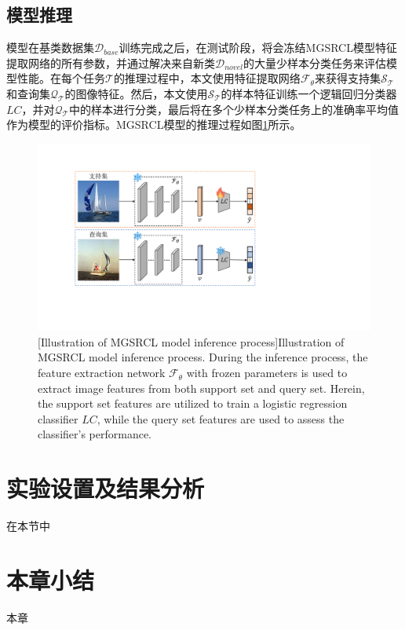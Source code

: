 \subsection[\hspace{-2pt}模型推理]{{\heiti{} \hspace{-8pt}模型推理}}\label{section3: 模型推理}
模型在基类数据集$\mathcal{D}_{base}$训练完成之后，在测试阶段，将会冻结MGSRCL模型特征提取网络的所有参数，并通过解决来自新类$\mathcal{D}_{novel}$的大量少样本分类任务来评估模型性能。在每个任务$\mathcal{T}$的推理过程中，本文使用特征提取网络$\mathcal{F}_{\theta}$来获得支持集$\mathcal{S}_\mathcal{T}$和查询集$\mathcal{Q}_\mathcal{T}$的图像特征。然后，本文使用$\mathcal{S}_\mathcal{T}$的样本特征训练一个逻辑回归分类器$LC$，并对$\mathcal{Q}_\mathcal{T}$中的样本进行分类，最后将在多个少样本分类任务上的准确率平均值作为模型的评价指标。MGSRCL模型的推理过程如图\ref{figure3: 推理过程}所示。

\begin{figure}[h]
\centering
{}
\includegraphics[width=0.8\columnwidth]{figures/MGSRCL/推理过程.pdf}
[Illustration of MGSRCL model inference process]{Illustration of MGSRCL model inference process. During the inference process, the feature extraction network $\mathcal{F}_{\theta}$ with frozen parameters is used to extract image features from both support set and query set. Herein, the support set features are utilized to train a logistic regression classifier $LC$, while the query set features are used to assess the classifier's performance.}
\vspace{-10pt}
\label{figure3: 推理过程}
\end{figure}

\section[\hspace{-2pt}实验设置及结果分析]{{\heiti{} \hspace{-8pt}实验设置及结果分析}}\label{section3: 实验设置及结果分析}
在本节中
\section[\hspace{-2pt}本章小结]{{\heiti{} \hspace{-8pt}本章小结}}\label{section3: 本章小结}

本章

